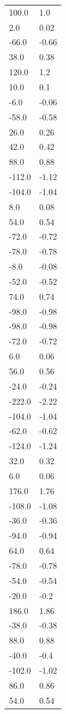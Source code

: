 \begin{longtable}{ll}
100.0 & 1.0 \\
2.0 & 0.02 \\
-66.0 & -0.66 \\
38.0 & 0.38 \\
120.0 & 1.2 \\
10.0 & 0.1 \\
-6.0 & -0.06 \\
-58.0 & -0.58 \\
26.0 & 0.26 \\
42.0 & 0.42 \\
88.0 & 0.88 \\
-112.0 & -1.12 \\
-104.0 & -1.04 \\
8.0 & 0.08 \\
54.0 & 0.54 \\
-72.0 & -0.72 \\
-78.0 & -0.78 \\
-8.0 & -0.08 \\
-52.0 & -0.52 \\
74.0 & 0.74 \\
-98.0 & -0.98 \\
-98.0 & -0.98 \\
-72.0 & -0.72 \\
6.0 & 0.06 \\
56.0 & 0.56 \\
-24.0 & -0.24 \\
-222.0 & -2.22 \\
-104.0 & -1.04 \\
-62.0 & -0.62 \\
-124.0 & -1.24 \\
32.0 & 0.32 \\
6.0 & 0.06 \\
176.0 & 1.76 \\
-108.0 & -1.08 \\
-36.0 & -0.36 \\
-94.0 & -0.94 \\
64.0 & 0.64 \\
-78.0 & -0.78 \\
-54.0 & -0.54 \\
-20.0 & -0.2 \\
186.0 & 1.86 \\
-38.0 & -0.38 \\
88.0 & 0.88 \\
-40.0 & -0.4 \\
-102.0 & -1.02 \\
86.0 & 0.86 \\
54.0 & 0.54 \\

\end{longtable}
